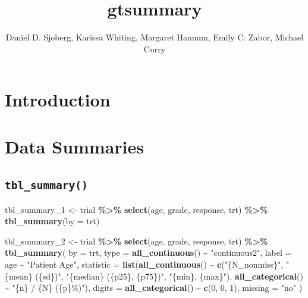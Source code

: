\documentclass[
]{article}
\title{gtsummary}
\author{Daniel D. Sjoberg, Karissa Whiting, Margaret Hannum, Emily C.
Zabor, Michael Curry}
\date{}
\newenvironment{Shaded}{\begin{snugshade}}{\end{snugshade}}
\newcommand{\DataTypeTok}[1]{\textcolor[rgb]{0.13,0.29,0.53}{#1}}
\newcommand{\DecValTok}[1]{\textcolor[rgb]{0.00,0.00,0.81}{#1}}
\newcommand{\KeywordTok}[1]{\textcolor[rgb]{0.13,0.29,0.53}{\textbf{#1}}}
\newcommand{\NormalTok}[1]{#1}
\newcommand{\OperatorTok}[1]{\textcolor[rgb]{0.81,0.36,0.00}{\textbf{#1}}}
\newcommand{\StringTok}[1]{\textcolor[rgb]{0.31,0.60,0.02}{#1}}
\begin{document}
\maketitle

\hypertarget{introduction}{%
\section{Introduction}\label{introduction}}

\hypertarget{data-summaries}{%
\section{Data Summaries}\label{data-summaries}}

\hypertarget{tbl_summary}{%
\subsection{\texorpdfstring{\texttt{tbl\_summary()}}{tbl\_summary()}}\label{tbl_summary}}

\begin{Shaded}
\begin{Highlighting}[]
\NormalTok{tbl\_summary\_}\DecValTok{1}\NormalTok{ <{-}}
\StringTok{  }\NormalTok{trial }\OperatorTok{\%>\%}
\StringTok{  }\KeywordTok{select}\NormalTok{(age, grade, response, trt) }\OperatorTok{\%>\%}
\StringTok{  }\KeywordTok{tbl\_summary}\NormalTok{(}\DataTypeTok{by =}\NormalTok{ trt)}
\end{Highlighting}
\end{Shaded}

\begin{Shaded}
\begin{Highlighting}[]
\NormalTok{tbl\_summary\_}\DecValTok{2}\NormalTok{ <{-}}
\StringTok{  }\NormalTok{trial }\OperatorTok{\%>\%}
\StringTok{  }\KeywordTok{select}\NormalTok{(age, grade, response, trt) }\OperatorTok{\%>\%}
\StringTok{  }\KeywordTok{tbl\_summary}\NormalTok{(}
    \DataTypeTok{by =}\NormalTok{ trt,}
    \DataTypeTok{type =} \KeywordTok{all\_continuous}\NormalTok{() }\OperatorTok{\textasciitilde{}}\StringTok{ "continuous2"}\NormalTok{,}
    \DataTypeTok{label =}\NormalTok{ age }\OperatorTok{\textasciitilde{}}\StringTok{ "Patient Age"}\NormalTok{,}
    \DataTypeTok{statistic =} \KeywordTok{list}\NormalTok{(}\KeywordTok{all\_continuous}\NormalTok{() }\OperatorTok{\textasciitilde{}}\StringTok{ }\KeywordTok{c}\NormalTok{(}\StringTok{"\{N\_nonmiss\}"}\NormalTok{, }
                                          \StringTok{"\{mean\} (\{sd\})"}\NormalTok{, }
                                          \StringTok{"\{median\} (\{p25\}, \{p75\})"}\NormalTok{, }
                                          \StringTok{"\{min\}, \{max\}"}\NormalTok{),}
                     \KeywordTok{all\_categorical}\NormalTok{() }\OperatorTok{\textasciitilde{}}\StringTok{ "\{n\} / \{N\} (\{p\}\%)"}\NormalTok{),}
    \DataTypeTok{digits =} \KeywordTok{all\_categorical}\NormalTok{() }\OperatorTok{\textasciitilde{}}\StringTok{ }\KeywordTok{c}\NormalTok{(}\DecValTok{0}\NormalTok{, }\DecValTok{0}\NormalTok{, }\DecValTok{1}\NormalTok{),}
    \DataTypeTok{missing =} \StringTok{"no"}
\NormalTok{  )}
\end{Highlighting}
\end{Shaded}
\end{document}
